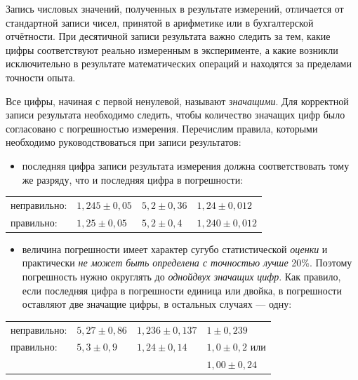Запись числовых значений, полученных в результате измерений, отличается
от стандартной записи чисел, принятой в арифметике или в бухгалтерской
отчётности. При десятичной записи результата важно следить за тем,
какие цифры соответствуют реально измеренным в эксперименте, а какие
возникли исключительно в результате математических операций и находятся
за пределами точности опыта.

Все цифры, начиная с первой ненулевой, называют \emph{значащими}.
Для корректной записи результата необходимо следить, чтобы количество
значащих цифр было согласовано с погрешностью измерения. Перечислим
правила, которыми необходимо руководствоваться при записи результатов: 
\begin{itemize}
\item последняя цифра записи результата измерения должна соответствовать
тому же разряду, что и последняя цифра в погрешности:
\end{itemize}
\noindent%
\begin{tabular}{llll}
неправильно:  & $1{,}245\pm0{,}05$  & $5{,}2\pm0{,}36$  & $1{,}24\pm0{,}012$\tabularnewline
правильно:  & $1{,}25\pm0{,}05$  & $5{,}2\pm0{,}4$  & $1{,}240\pm0{,}012$ \tabularnewline
\end{tabular}
\begin{itemize}
\item величина погрешности имеет характер сугубо статистической \emph{оценки}
и практически \emph{не может быть определена с точностью лучше} 20\%.
Поэтому погрешность нужно округлять до \emph{одной\textendash двух
значащих цифр}. Как правило, если последняя цифра в погрешности единица
или двойка, в погрешности оставляют две значащие цифры, в остальных
случаях --- одну:
\end{itemize}
\noindent%
\begin{tabular}{llll}
неправильно:  & $5{,}27\pm0{,}86$  & $1{,}236\pm0{,}137$  & $1\pm0{,}239$\tabularnewline
правильно:  & $5{,}3\pm0{,}9$ & $1{,}24\pm0{,}14$ & $1{,}0\pm0{,}2$ или\tabularnewline
 &  &  & $1{,}00\pm0{,}24$\tabularnewline
\end{tabular}

\medskip{}

